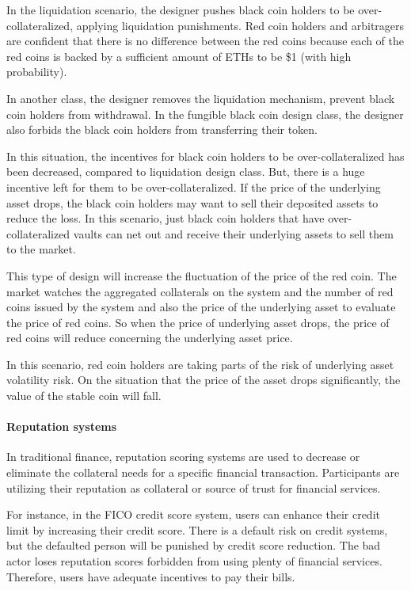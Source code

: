 In the liquidation scenario, the designer pushes black coin holders to be over-collateralized, applying liquidation punishments. Red coin holders and arbitragers are confident that there is no difference between the red coins because each of the red coins is backed by a sufficient amount of ETHs to be \$1 (with high probability).

In another class, the designer removes the liquidation mechanism, prevent black coin holders from withdrawal. In the fungible black coin design class, the designer also forbids the black coin holders from transferring their token. 

In this situation, the incentives for black coin holders to be over-collateralized has been decreased, compared to liquidation design class. But, there is a huge incentive left for them to be over-collateralized. If the price of the underlying asset drops, the black coin holders may want to sell their deposited assets to reduce the loss. In this scenario, just black coin holders that have over-collateralized vaults can net out and receive their underlying assets to sell them to the market.

This type of design will increase the fluctuation of the price of the red coin. The market watches the aggregated collaterals on the system and the number of red coins issued by the system and also the price of the underlying asset to evaluate the price of red coins. So when the price of underlying asset drops, the price of red coins will reduce concerning the underlying asset price. 

In this scenario, red coin holders are taking parts of the risk of underlying asset volatility risk. On the situation that the price of the asset drops significantly, the value of the stable coin will fall.

\paragraph{Reputation systems}

In traditional finance, reputation scoring systems are used to decrease or eliminate the collateral needs for a specific financial transaction. Participants are utilizing their reputation as collateral or source of trust for financial services. 

For instance, in the FICO credit score system, users can enhance their credit limit by increasing their credit score. There is a default risk on credit systems, but the defaulted person will be punished by credit score reduction. The bad actor loses reputation scores forbidden from using plenty of financial services. Therefore, users have adequate incentives to pay their bills.

